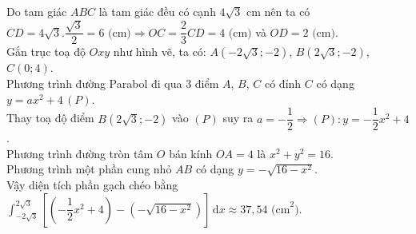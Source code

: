 \begin{ex}
{\begin{center}
		\end{center}
		Do tam giác $ABC$ là tam giác đều có cạnh $4\sqrt{3} \text{ cm}$ nên  ta có
		$CD = 4\sqrt{3}.\dfrac{\sqrt{3}}{2} = 6 \text{ (cm)} \Rightarrow OC = \dfrac{2}{3}CD = 4 \text{ (cm)}$ và $OD = 2 \text{  (cm)}$.\\
		Gắn trục toạ độ $Oxy$ như hình vẽ, ta có: $A(-2\sqrt{3};-2)$, $B(2\sqrt{3};-2)$,  $C(0;4)$.\\
		Phương trình đường Parabol đi qua $3$ điểm $A$, $B$, $C$ có đỉnh  $C$ có dạng $y = ax^2 + 4 \,(P)$.\\
		Thay toạ độ điểm $B(2\sqrt{3};-2)$ vào $(P)$ suy ra $a = -\dfrac{1}{2} \Rightarrow  (P): y = -\dfrac{1}{2}x^2 + 4$.\\
		Phương trình đường tròn tâm $O$ bán kính $OA = 4$ là $x^2 + y^2 = 16$.\\ 
		 Phương trình một phần cung nhỏ $AB$ có dạng $y = -\sqrt{16 - x^2}$.\\
		Vậy diện tích phần gạch chéo bằng $\displaystyle\int_{-2\sqrt{3}}^{2\sqrt{3}} \left[\left(-\dfrac{1}{2}x^2 + 4\right) - \left(-\sqrt{16 - x^2}\right) \right] \mathrm{\,d}x \approx 37,54  \text{ (cm}^2)$.
	} 
\end{ex}


